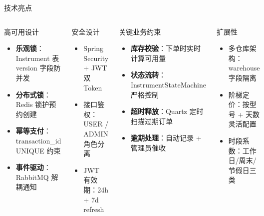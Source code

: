 \documentclass[aspectratio=169,10pt]{beamer}
\newcommand{\pos}[1]{\textcolor{positive}{#1}}
\newcommand{\con}[1]{\textcolor{negative}{#1}}
\begin{document}
\begin{frame}{技术亮点}
  \vspace{4pt}
  \begin{columns}[T]
    \begin{exampleblock}{\pos{高可用设计}}
      \begin{itemize}
        \item \textbf{乐观锁}：Instrument 表 version 字段防并发
        \item \textbf{分布式锁}：Redis 锁护预约创建
        \item \textbf{幂等支付}：transaction\_id UNIQUE 约束
        \item \textbf{事件驱动}：RabbitMQ 解耦通知
      \end{itemize}
    \end{exampleblock}

    \vspace{4pt}
    \begin{block}{安全设计}
      \begin{itemize}
        \item Spring Security + JWT 双 Token
        \item 接口鉴权：USER / ADMIN 角色分离
        \item JWT 有效期：24h + 7d refresh
      \end{itemize}
    \end{block}

    \begin{alertblock}{\con{关键业务约束}}
      \begin{itemize}
        \item \textbf{库存校验}：下单时实时计算可用量
        \item \textbf{状态流转}：InstrumentStateMachine 严格控制
        \item \textbf{超时释放}：Quartz 定时扫描过期订单
        \item \textbf{逾期处理}：自动记录 + 管理员催收
      \end{itemize}
    \end{alertblock}

    \vspace{4pt}
    \begin{block}{扩展性}
      \begin{itemize}
        \item 多仓库架构：warehouse 字段隔离
        \item 阶梯定价：按型号 + 天数灵活配置
        \item 时段系数：工作日/周末/节假日三类
      \end{itemize}
    \end{block}
  \end{columns}
\end{frame}
\end{document}
